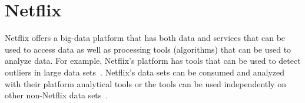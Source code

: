 \section{Netflix}

Netflix offers a big-data platform that has both data and services that can be
used to access data as well as processing tools (algorithms) that can be used
to analyze data.  For example, Netflix's platform has tools that can be used to
detect outliers in large data sets~\cite{hid-sp18-505-Wong2015}.  Netflix’s data sets can be
consumed and analyzed with their platform analytical tools or the tools can be
used independently on other non-Netflix data sets~\cite{hid-sp18-505-Netflix2018}.
